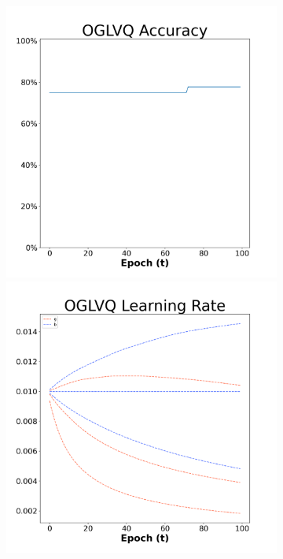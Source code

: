 \begin{figure}[H]
    \centering %
\begin{subfigure}{0.3\textwidth}
  \includegraphics[width=\linewidth]{images/exper1/Ionosphere/OGLVQ_0.01_acc.png}
    \includegraphics[width=\linewidth]{images/exper1/Ionosphere/OGLVQ_0.01_lr.png}

\end{subfigure}
\end{figure}
